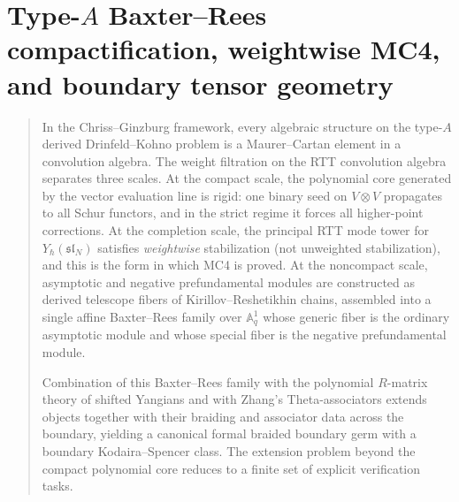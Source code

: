 
\chapter{Type-$A$ Baxter--Rees compactification, weightwise MC4, and boundary tensor geometry}
\label{app:typeA-baxter-rees-theta}

\begin{quote}
In the Chriss--Ginzburg framework, every algebraic structure on the
type-$A$ derived Drinfeld--Kohno problem is a Maurer--Cartan element in a
convolution algebra. The weight filtration on the
RTT convolution algebra separates three scales. At the compact scale, the
polynomial core generated by the vector evaluation line is rigid: one
binary seed on $V\otimes V$ propagates to all Schur functors, and in the
strict regime it forces all higher-point corrections. At the completion
scale, the principal RTT mode tower for $Y_\hbar(\mathfrak{sl}_N)$
satisfies \emph{weightwise} stabilization (not unweighted stabilization),
and this is the form in which MC4 is proved. At the noncompact scale,
asymptotic and negative prefundamental modules are constructed as derived
telescope fibers of Kirillov--Reshetikhin chains, assembled into a single
affine Baxter--Rees family over $\mathbb A^1_q$ whose generic fiber is the
ordinary asymptotic module and whose special fiber is the negative
prefundamental module.

Combination of this Baxter--Rees family with the polynomial $R$-matrix
theory of shifted Yangians and with Zhang's Theta-associators extends
objects together with their braiding and associator data across the
boundary, yielding a canonical formal braided boundary germ with a
boundary Kodaira--Spencer class. The extension problem beyond the
compact polynomial core reduces to a finite set of explicit
verification tasks.
\end{quote}

